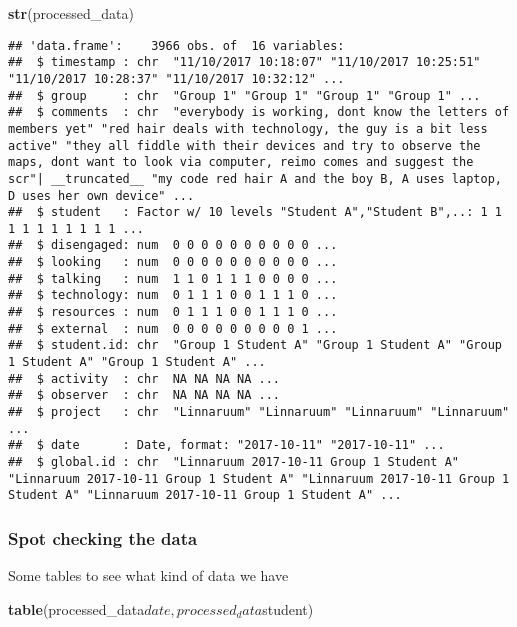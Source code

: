 \documentclass[]{article}
\newenvironment{Shaded}{\begin{snugshade}}{\end{snugshade}}
\newcommand{\KeywordTok}[1]{\textcolor[rgb]{0.13,0.29,0.53}{\textbf{{#1}}}}
\newcommand{\NormalTok}[1]{{#1}}
\begin{document}
\begin{Shaded}
\begin{Highlighting}[]
\KeywordTok{str}\NormalTok{(processed_data)}
\end{Highlighting}
\end{Shaded}

\begin{verbatim}
## 'data.frame':    3966 obs. of  16 variables:
##  $ timestamp : chr  "11/10/2017 10:18:07" "11/10/2017 10:25:51" "11/10/2017 10:28:37" "11/10/2017 10:32:12" ...
##  $ group     : chr  "Group 1" "Group 1" "Group 1" "Group 1" ...
##  $ comments  : chr  "everybody is working, dont know the letters of members yet" "red hair deals with technology, the guy is a bit less active" "they all fiddle with their devices and try to observe the maps, dont want to look via computer, reimo comes and suggest the scr"| __truncated__ "my code red hair A and the boy B, A uses laptop, D uses her own device" ...
##  $ student   : Factor w/ 10 levels "Student A","Student B",..: 1 1 1 1 1 1 1 1 1 1 ...
##  $ disengaged: num  0 0 0 0 0 0 0 0 0 0 ...
##  $ looking   : num  0 0 0 0 0 0 0 0 0 0 ...
##  $ talking   : num  1 1 0 1 1 1 0 0 0 0 ...
##  $ technology: num  0 1 1 1 0 0 1 1 1 0 ...
##  $ resources : num  0 1 1 1 0 0 1 1 1 0 ...
##  $ external  : num  0 0 0 0 0 0 0 0 0 1 ...
##  $ student.id: chr  "Group 1 Student A" "Group 1 Student A" "Group 1 Student A" "Group 1 Student A" ...
##  $ activity  : chr  NA NA NA NA ...
##  $ observer  : chr  NA NA NA NA ...
##  $ project   : chr  "Linnaruum" "Linnaruum" "Linnaruum" "Linnaruum" ...
##  $ date      : Date, format: "2017-10-11" "2017-10-11" ...
##  $ global.id : chr  "Linnaruum 2017-10-11 Group 1 Student A" "Linnaruum 2017-10-11 Group 1 Student A" "Linnaruum 2017-10-11 Group 1 Student A" "Linnaruum 2017-10-11 Group 1 Student A" ...
\end{verbatim}

\subsubsection{Spot checking the data}\label{spot-checking-the-data}

Some tables to see what kind of data we have

\begin{Shaded}
\begin{Highlighting}[]
\KeywordTok{table}\NormalTok{(processed_data$date, processed_data$student)}
\end{Highlighting}
\end{Shaded}
\end{document}
